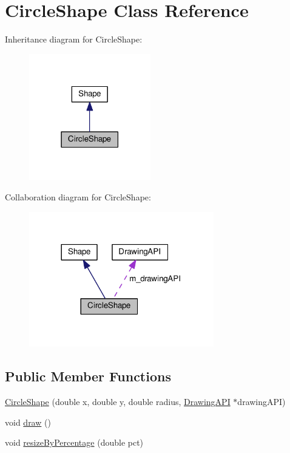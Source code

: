 \hypertarget{classCircleShape}{}\section{Circle\+Shape Class Reference}
\label{classCircleShape}


Inheritance diagram for Circle\+Shape\+:
\nopagebreak
\begin{figure}[H]
\begin{center}
\leavevmode
\includegraphics[width=150pt]{classCircleShape__inherit__graph}
\end{center}
\end{figure}


Collaboration diagram for Circle\+Shape\+:
\nopagebreak
\begin{figure}[H]
\begin{center}
\leavevmode
\includegraphics[width=228pt]{classCircleShape__coll__graph}
\end{center}
\end{figure}
\subsection*{Public Member Functions}
\begin{DoxyCompactItemize}
\item 
\hyperlink{classCircleShape_ad9d9792af7f2be56f6b15ffbd6629871}{Circle\+Shape} (double x, double y, double radius, \hyperlink{classDrawingAPI}{Drawing\+A\+PI} $\ast$drawing\+A\+PI)
\item 
void \hyperlink{classCircleShape_ad9f83c69677b1091ea4b2bfdb5f27c07}{draw} ()
\item 
void \hyperlink{classCircleShape_adadfd28583f61407130eee10bb33adb1}{resize\+By\+Percentage} (double pct)
\end{DoxyCompactItemize}
